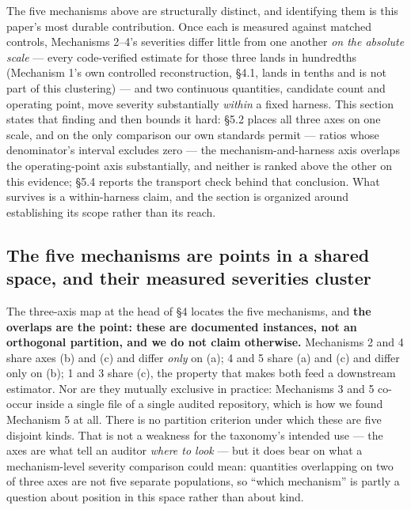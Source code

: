 \documentclass[10pt]{article} %
\begin{document}
The five mechanisms above are structurally distinct, and identifying them is
this paper's most durable contribution. Once each is measured against matched
controls, Mechanisms 2--4's severities differ little from one another
\emph{on the absolute scale} --- every code-verified estimate for those three
lands in hundredths (Mechanism 1's own controlled reconstruction, §4.1, lands
in tenths and is not part of this clustering) --- and
two continuous quantities, candidate count and operating point, move severity
substantially \emph{within} a fixed harness. This section states that finding
and then bounds it hard: §5.2 places all three axes on one scale, and on the
only comparison our own standards permit --- ratios whose denominator's
interval excludes zero --- the mechanism-and-harness axis overlaps the
operating-point axis substantially, and neither is ranked above the other on
this evidence; §5.4 reports the transport check behind that conclusion.
What survives is a within-harness claim, and the section is organized around
establishing its scope rather than its reach.

\subsection{The five mechanisms are points in a shared space, and their measured severities cluster}

The three-axis map at the head of §4 locates the five mechanisms, and
\textbf{the overlaps are the point: these are documented instances, not an
orthogonal partition, and we do not claim otherwise.} Mechanisms 2 and 4 share
axes (b) and (c) and differ \emph{only} on (a); 4 and 5 share (a) and (c) and
differ only on (b); 1 and 3 share (c), the property that makes both feed a
downstream estimator. Nor are they mutually exclusive in practice: Mechanisms 3
and 5 co-occur inside a single file of a single audited repository, which is
how we found Mechanism 5 at all. There is no partition criterion under which
these are five disjoint kinds. That is not a weakness for the taxonomy's
intended use --- the axes are what tell an auditor \emph{where to look} --- but
it does bear on what a mechanism-level severity comparison could mean:
quantities overlapping on two of three axes are not five separate populations,
so ``which mechanism'' is partly a question about position in this space rather
than about kind.
\end{document}
